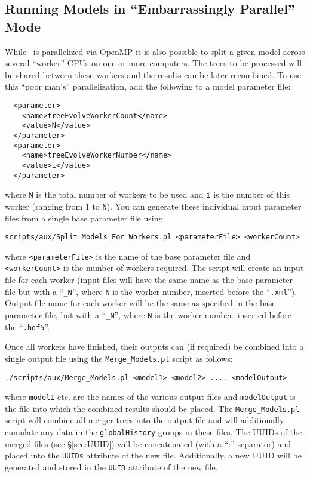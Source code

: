 \subsection{Running Models in ``Embarrassingly Parallel'' Mode}

While \glc\ is parallelized via OpenMP it is also possible to split a given model across several ``worker'' CPUs on one or more computers. The trees to be processed will be shared between these workers and the results can be later recombined. To use this ``poor man's'' parallelization, add the following to a model parameter file:
\begin{verbatim}
  <parameter>
    <name>treeEvolveWorkerCount</name>
    <value>N</value>
  </parameter>
  <parameter>
    <name>treeEvolveWorkerNumber</name>
    <value>i</value>
  </parameter>
\end{verbatim}
where {\tt N} is the total number of workers to be used and {\tt i} is the number of this worker (ranging from 1 to {\tt N}). You can generate these individual input parameter files from a single base parameter file using:
\begin{verbatim}
scripts/aux/Split_Models_For_Workers.pl <parameterFile> <workerCount>
\end{verbatim}
where {\tt <parameterFile>} is the name of the base parameter file and {\tt <workerCount>} is the number of workers required. The script will create an input file for each worker (input files will have the same name as the base parameter file but with a ``{\tt \_N}'', where {\tt N} is the worker number, inserted before the ``{\tt .xml}''). Output file name for each worker will be the same as specified in the base parameter file, but with a ``{\tt \_N}'', where {\tt N} is the worker number, inserted before the ``{\tt .hdf5}''.

Once all workers have finished, their outputs can (if required) be combined into a single output file using the {\tt Merge\_Models.pl} script as follows:
\begin{verbatim}
./scripts/aux/Merge_Models.pl <model1> <model2> .... <modelOutput>
\end{verbatim}
where {\tt model1} etc. are the names of the various output files and {\tt modelOutput} is the file into which the combined results should be placed. The {\tt Merge\_Models.pl} script will combine all merger trees into the output file and will additionally cumulate any data in the {\tt globalHistory} groups in these files. The UUIDs of the merged files (see \S\ref{sec:UUID}) will be concatenated (with a ``:'' separator) and placed into the {\tt UUIDs} attribute of the new file. Additionally, a new UUID will be generated and stored in the {\tt UUID} attribute of the new file.

